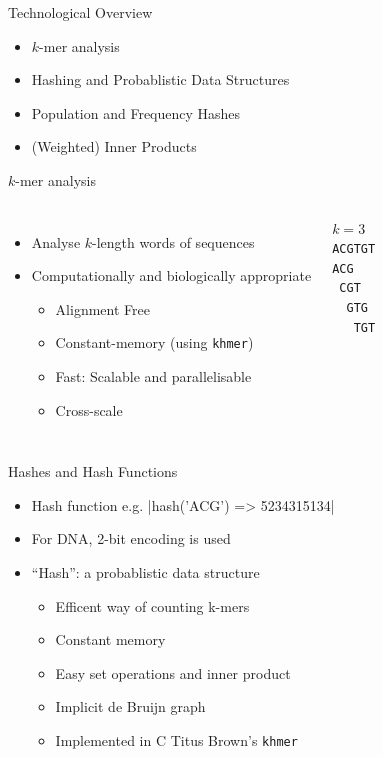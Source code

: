 \documentclass[t]{beamer}
\begin{document}
\begin{frame}{Technological Overview}
  \begin{itemize}
    \item $k$-mer analysis
    \item Hashing and Probablistic Data Structures
    \item Population and Frequency Hashes
    \item (Weighted) Inner Products
  \end{itemize}
\end{frame}

\begin{frame}{$k$-mer analysis}
  \begin{columns}[t]
      \begin{itemize}
        \item<1-> Analyse $k$-length words of sequences
        \item<2> Computationally and biologically appropriate
        \begin{itemize}
          \item<2> Alignment Free
          \item<2> Constant-memory (using \texttt{khmer})
          \item<2> Fast: Scalable and parallelisable
          \item<2> Cross-scale
        \end{itemize}
      \end{itemize}
      \vfill
    $k = 3$\\
    \texttt{ACGTGT}\\
    \texttt{ACG~~~}\\
    \texttt{~CGT~~}\\
    \texttt{~~GTG~}\\
    \texttt{~~~TGT}
  \end{columns}
\end{frame}

\begin{frame}{Hashes and Hash Functions}
  \begin{itemize}
    \item Hash function e.g. |hash('ACG') => 5234315134|
    \item For DNA, 2-bit encoding is used
      \pause
    \item ``Hash'': a probablistic data structure
      \begin{itemize}
        \item Efficent way of counting k-mers
        \item Constant memory
        \item Easy set operations and inner product
        \item Implicit de Bruijn graph
        \item Implemented in C Titus Brown's \texttt{khmer}
      \end{itemize}
  \end{itemize}
\end{frame}
\end{document}
